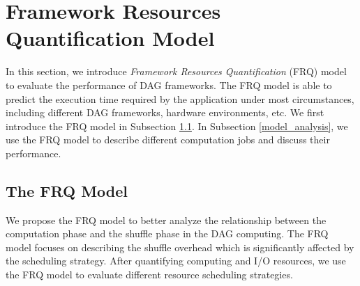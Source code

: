 {\color{black}
\section{Framework Resources Quantification Model}\label{model}

In this section, we introduce \textit{Framework Resources Quantification} (FRQ) model to evaluate the performance of DAG frameworks.
The FRQ model is able to predict the execution time required by the application under most circumstances, including different DAG frameworks, hardware environments, etc.
We first introduce the FRQ model in Subsection \ref{model_overview}. In Subsection \ref{model_analysis}, we use the FRQ model to describe different computation jobs and discuss their performance.

\subsection{The FRQ Model}\label{model_overview}
{\color{black}
We propose the FRQ model to better analyze the relationship between the computation phase and the shuffle phase in the DAG computing.
The FRQ model focuses on describing the shuffle overhead which is significantly affected by the scheduling strategy.
After quantifying computing and I/O resources, we use the FRQ model to evaluate different resource scheduling strategies.

}}

